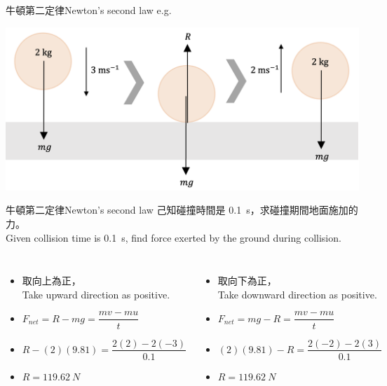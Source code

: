 \documentclass[13pt]{beamer}
\begin{document}
\begin{frame}{牛頓第二定律Newton's second law}
    e.g.
        {\par\centering
            \includegraphics[width=.8\textwidth]{assets/16fb42f7.png}
            \par}



\end{frame}
\begin{frame}{牛頓第二定律Newton's second law}
    己知碰撞時間是 \qty{0.1}{s}，求碰撞期間地面施加的力。\\Given collision time is \qty{0.1}{s}, find force exerted by the ground  during collision.\medskip
    \begin{columns}
        \begin{itemize}
            \setlength{\itemsep}{0.6em}
            \item 取向上為正，\\Take upward direction as positive.
            \item []$F_{net}=R-mg = \dfrac{mv-mu}{t}$
            \item []$R-(2)(9.81)=\dfrac{2(2)-2(-3)}{0.1}$
            \item [] $R=\qty{119.62}{N}$
        \end{itemize}
        \begin{itemize}
            \setlength{\itemsep}{0.6em}
            \item 取向下為正，\\Take downward direction as positive.
            \item []$F_{net}=mg-R = \dfrac{mv-mu}{t}$
            \item []$(2)(9.81)-R=\dfrac{2(-2)-2(3)}{0.1}$
            \item [] $R=\qty{119.62}{N}$
        \end{itemize}

    \end{columns}
\end{frame}
\end{document}
